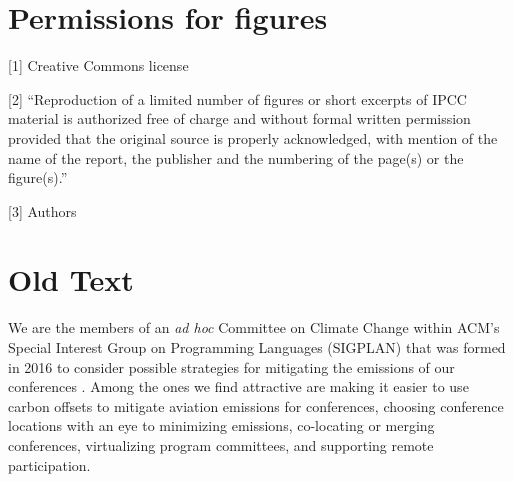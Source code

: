 \documentclass[12pt]{article}
\newcommand{\bcp}[1]{\ifdraft{\bf\textcolor{darkred}{[\bf bcp: #1]}}\fi}
\begin{document}
\iflater
\bcp{Things still missing:
  \begin{itemize}
  \item do we need any more citations for the claims we make?
<<<<<<< HEAD
  \item Find a place for this: {\tt acm-climate} mailing list~\cite{acm-climate}
=======
  \item Find a place for the {\tt acm-climate} mailing list~\cite{acm-climate}
  \item Recheck and fix citations
  \item scan the stuff below and delete it
>>>>>>> daf35fb4dcf0eb47ccddefece95d1fa674ddf06b
  \end{itemize}
}
\fi

\newpage
\section*{Permissions for figures}

[1] Creative Commons license

[2] ``Reproduction of a limited number of figures or short excerpts of IPCC material is authorized free of charge and without formal written permission provided that the original source is properly acknowledged, with mention of the name of the report, the publisher and the numbering of the page(s) or the figure(s).''

[3] Authors

\section*{Old Text}

We are the members of an {\em ad hoc} Committee on Climate Change within
ACM's Special Interest Group on Programming Languages (SIGPLAN) that was
formed in 2016 to consider possible strategies for mitigating the emissions
of our conferences \cite{ClimateCommitteReport}. Among the ones we find
attractive are making it easier to use carbon offsets to mitigate aviation
emissions for conferences, choosing conference locations with an eye to
minimizing emissions, co-locating or merging conferences, virtualizing
program committees, and supporting remote participation.
\end{document}
